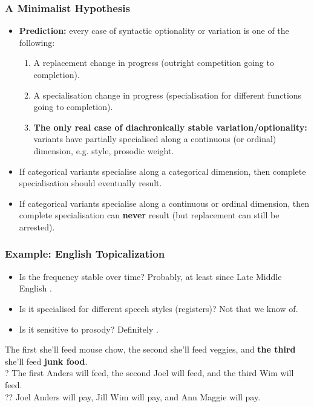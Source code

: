 \documentclass[hyperref={pdfpagelabels=false}]{beamer}
\begin{document}
\begin{frame}
\frametitle{A Minimalist Hypothesis}
\begin{itemize}
	\item \textbf{Prediction:} every case of syntactic optionality or variation is one of the following:
		\begin{enumerate}
			\item A replacement change in progress (outright competition going to completion).
			\item A specialisation change in progress (specialisation for different functions going to completion).
			\item \textbf{The only real case of diachronically stable variation/optionality:} variants have partially specialised along a continuous (or ordinal) dimension, e.g. style, prosodic weight. 
		\end{enumerate}
	\item If categorical variants specialise along a categorical dimension, then complete specialisation should eventually result.
	\item If categorical variants specialise along a continuous or ordinal dimension, then complete specialisation can \textbf{never} result (but replacement can still be arrested).
\end{itemize}

\end{frame}

\begin{frame}
\frametitle{Example: English Topicalization}

\begin{itemize}
	\item Is the frequency stable over time? Probably, at least since Late Middle English \citep{speyer2010}.
	\item Is it specialised for different speech styles (registers)? Not that we know of.
	\item Is it sensitive to prosody? Definitely \citep{speyer2010}.
\end{itemize}

	\begin{exe}

	\ex  The first she'll feed mouse chow, the second she'll feed veggies, and \textbf{the third} she'll feed  \textbf{junk food}.\\

	\ex  ? The first Anders will feed, the second Joel will feed, and the third Wim will feed. \\

	\ex  ?? Joel Anders will pay, Jill Wim will pay, and Ann Maggie will pay. \\

	\end{exe}
\end{frame}
\end{document}
